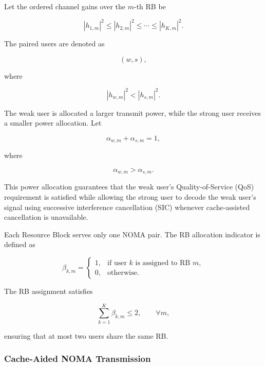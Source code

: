 \documentclass[12pt,a4paper]{article}
\begin{document}
Let the ordered channel gains over the $m$-th RB be

\begin{equation}
|h_{1,m}|^2
\le
|h_{2,m}|^2
\le
\cdots
\le
|h_{K,m}|^2.
\end{equation}

The paired users are denoted as

\begin{equation}
(w,s),
\end{equation}

where

\begin{equation}
|h_{w,m}|^2<|h_{s,m}|^2.
\end{equation}

The weak user is allocated a larger transmit power, while the strong user receives a smaller power allocation. Let

\begin{equation}
\alpha_{w,m}+\alpha_{s,m}=1,
\end{equation}

where

\begin{equation}
\alpha_{w,m}>\alpha_{s,m}.
\end{equation}

This power allocation guarantees that the weak user's Quality-of-Service (QoS) requirement is satisfied while allowing the strong user to decode the weak user's signal using successive interference cancellation (SIC) whenever cache-assisted cancellation is unavailable.

Each Resource Block serves only one NOMA pair. The RB allocation indicator is defined as

\begin{equation}
\beta_{k,m}
=
\begin{cases}
1,&\text{if user }k\text{ is assigned to RB }m,\\
0,&\text{otherwise}.
\end{cases}
\end{equation}

The RB assignment satisfies

\begin{equation}
\sum_{k=1}^{K}\beta_{k,m}\le2,
\qquad
\forall m,
\end{equation}

ensuring that at most two users share the same RB.

\subsubsection{Cache-Aided NOMA Transmission}
\end{document}
